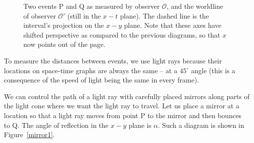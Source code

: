 \documentclass[11pt]{article}
\begin{document}
\begin{figure}[h!]
	\caption{Two events P and Q as measured by observer $\mathcal{O}$, and the worldline of observer $\mathcal{O'}$ (still in the $x-t$ plane). The dashed line is the interval's projection on the $x-y$ plane. Note that these axes have shifted perspective as compared to the previous diagrams, so that $x$ now points out of the page.}
	\label{inv_s}
\end{figure}

To measure the distances between events, we use light rays because their locations on space-time graphs are always the same -- at a $45^\circ$ angle (this is a consequence of the speed of light being the same in every frame).

We can control the path of a light ray with carefully placed mirrors along parts of the light cone where we want the light ray to travel. Let us place a mirror at a location so that a light ray moves from point P to the mirror and then bounces to Q. The angle of reflection in the $x-y$ plane is $\alpha$. Such a diagram is shown in Figure~\ref{mirror1}.
\end{document}

